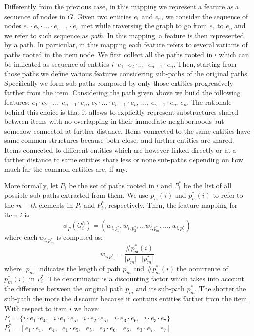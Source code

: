 Differently from the previous case, in this mapping we represent a feature as a sequence of nodes in $G$. Given two entities $e_1$ and $e_n$, we consider the sequence of nodes $e_1 \cdot e_2 \cdot \ldots \cdot e_{n-1} \cdot e_n$ met while traversing the graph to go from $e_1$ to $e_n$ and we refer to such sequence as \textit{path}. In this  mapping, a feature is then represented by a path. In particular, in this mapping each feature refers to several variants of paths rooted in the item node. 
We first collect all the paths rooted in $i$ which can be indicated as sequence of entities $i\cdot e_1 \cdot e_2 \cdot \ldots \cdot e_{n-1} \cdot e_n$. 
Then, starting from those paths we define various features considering sub-paths of the original paths. Specifically we form sub-paths composed by only those entities progressively farther from the item.
Considering the path given above we build the following features: $e_1 \cdot e_2 \cdot  \ldots \cdot  e_{n-1} \cdot  e_n$, $e_2 \cdot  \ldots \cdot  e_{n-1} \cdot  e_n$, ..., $e_{n-1} \cdot  e_n$, $e_n$. 
The rationale behind this choice is that it allows to explicitly represent substructures shared between items with no overlapping in their immediate neighborhoods but somehow connected at further distance. Items connected to the same entities have same common structures because both closer and further entities are shared. Items connected to different entities which are however linked directly or at a farther distance to same entities  share less or none sub-paths depending on how much far the common entities are, if any.

More formally, let $P_i$ be the set of paths rooted in $i$ and $P^*_i$ be the list of all possible sub-paths extracted from them. We use $p_m(i)$ and $p^*_m(i)$ to refer to the $m-th$ elements in $P_i$ and $P^*_i$, respectively. Then, the feature mapping for item $i$ is:
\[
\phi_P(G^h_i)=(w_{i,p^*_1} ,w_{i,p^*_2} ,...w_{i,p^*_m} ,...,w_{i,p^*_t} )
\]
where each $w_{i,p^*_m}$%
is computed as:
\[
w_{i,p^*_m}=  \frac{ \# p^*_m(i) }{ \vert p_m \vert - \vert p^*_m \vert} 
\] 
where $\vert p_m \vert$ indicates the length of path $p_m$ and $\# p^*_m(i)$ the occurrence of $p^*_m(i)$ in $P^*_i$. The denominator is a discounting factor which takes into account the difference between the original path $p_m$ and its sub-path $p^*_m$. The shorter the sub-path the more the discount because it contains entities farther from the item. 
\\With respect to item $i$ we have:\\
$P_i= \lbrace i \cdot e_1 \cdot e_4,\text{ }i \cdot e_1 \cdot e_5,\text{ } i \cdot e_2 \cdot e_5,\text{ } i \cdot e_3 \cdot e_6,\text{ } i \cdot e_3 \cdot e_7 \rbrace$\\
$P^*_i= [ e_1 \cdot e_4,\text{ } e_4,\text{ } e_1 \cdot e_5,\text{ }e_5,\text{ } e_3 \cdot e_6,\text{ } e_6
,\text{ } e_3 \cdot e_7,\text{ } e_7 ]$


